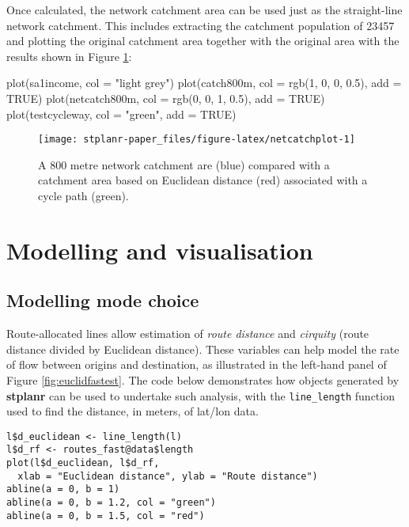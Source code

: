 Once calculated, the network catchment area can be used just as the
straight-line network catchment. This includes extracting the catchment
population of 23457 and plotting the original catchment area together
with the original area with the results shown in Figure
\ref{fig:netcatchplot}:

\begin{Schunk}
\begin{Sinput}
plot(sa1income, col = "light grey")
plot(catch800m, col = rgb(1, 0, 0, 0.5), add = TRUE)
plot(netcatch800m, col = rgb(0, 0, 1, 0.5), add = TRUE)
plot(testcycleway, col = "green", add = TRUE)
\end{Sinput}
\begin{figure}
\texttt{[image: stplanr-paper\_files/figure-latex/netcatchplot-1]} \caption[A 800 metre network catchment are (blue) compared with a catchment area based on Euclidean distance (red) associated with a cycle path (green)]{A 800 metre network catchment are (blue) compared with a catchment area based on Euclidean distance (red) associated with a cycle path (green).}\label{fig:netcatchplot}
\end{figure}
\end{Schunk}

\section{Modelling and visualisation}\label{modelling-and-visualisation}

\subsection{Modelling mode choice}\label{modelling-mode-choice}

Route-allocated lines allow estimation of \emph{route distance} and
\emph{cirquity} (route distance divided by Euclidean distance). These
variables can help model the rate of flow between origins and
destination, as illustrated in the left-hand panel of Figure
\ref{fig:euclidfastest}. The code below demonstrates how objects
generated by \textbf{stplanr} can be used to undertake such analysis,
with the \texttt{line\_length} function used to find the distance, in
meters, of lat/lon data.

\begin{verbatim}
l$d_euclidean <- line_length(l)
l$d_rf <- routes_fast@data$length
plot(l$d_euclidean, l$d_rf,
  xlab = "Euclidean distance", ylab = "Route distance")
abline(a = 0, b = 1)
abline(a = 0, b = 1.2, col = "green")
abline(a = 0, b = 1.5, col = "red")
\end{verbatim}

